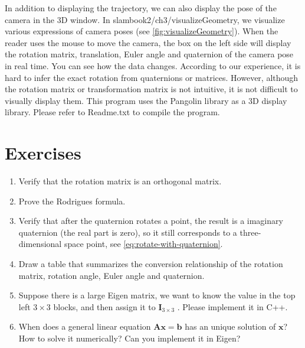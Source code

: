 In addition to displaying the trajectory, we can also display the pose of the camera in the 3D window. In slambook2/ch3/visualizeGeometry, we visualize various expressions of camera poses (see \autoref{fig:visualizeGeometry}). When the reader uses the mouse to move the camera, the box on the left side will display the rotation matrix, translation, Euler angle and quaternion of the camera pose in real time. You can see how the data changes. According to our experience, it is hard to infer the exact rotation from quaternions or matrices. However, although the rotation matrix or transformation matrix is not intuitive, it is not difficult to visually display them. This program uses the Pangolin library as a 3D display library. Please refer to Readme.txt to compile the program.

\section*{Exercises}
\begin{enumerate}
	\item Verify that the rotation matrix is an orthogonal matrix.
	\item Prove the Rodrigues formula.
	\item Verify that after the quaternion rotates a point, the result is a imaginary quaternion (the real part is zero), so it still corresponds to a three-dimensional space point, see \eqref{eq:rotate-with-quaternion}.
	\item Draw a table that summarizes the conversion relationship of the rotation matrix, rotation angle, Euler angle and quaternion.
	\item Suppose there is a large Eigen matrix, we want to know the value in the top left $3 \times 3$ blocks, and then assign it to $\mathbf{I}_{3 \times 3}$ . Please implement it in C++.
	\item When does a general linear equation $\mathbf{A} \mathbf{x}=\mathbf{b}$ has an unique solution of $\mathbf{x}$? How to solve it numerically? Can you implement it in Eigen?
\end{enumerate}
